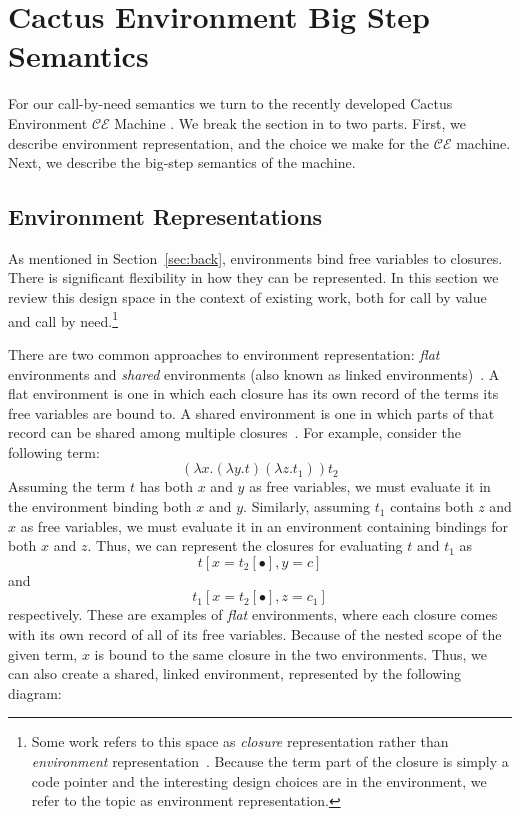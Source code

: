 \section{Cactus Environment Big Step Semantics} \label{sec:cem}

For our call-by-need semantics we turn to the recently developed Cactus
Environment $\mathcal{CE}$ Machine \cite{?}. We break the section in to two
parts. First, we describe environment representation, and the choice we make for
the $\mathcal{CE}$ machine. Next, we describe the big-step semantics of the
machine.

\subsection{Environment Representations}

As mentioned in Section~\ref{sec:back}, environments bind free variables to
closures. There is significant flexibility in how they can be represented. In
this section we review this design space in the context of existing work, both
for call by value and call by need.\footnote{Some work refers to this space as
\emph{closure} representation rather than \emph{environment}
representation~\cite{shao1994space,appel1988optimizing}.  Because the term
part of the closure is simply a code pointer and the interesting design
choices are in the environment, we refer to the topic as environment
representation.}

There are two common approaches to environment representation: \emph{flat}
environments and \emph{shared} environments (also known as linked
environments)~\cite{appel1988optimizing,shao1994space}. A flat environment is
one in which each closure has its own record of the terms its free variables are
bound to. A shared environment is one in which parts of that record can be
shared among multiple closures~\cite{appel1988optimizing,shao1994space}. For
example, consider the following term: $$(\lambda x.(\lambda y.t) (\lambda
z.t_1)) t_2$$ Assuming the term $t$ has both $x$ and $y$ as free variables, we
must evaluate it in the environment binding both $x$ and $y$.  Similarly,
assuming $t_1$ contains both $z$ and $x$ as free variables, we must evaluate it
in an environment containing bindings for both $x$ and $z$. Thus, we can
represent the closures for evaluating $t$ and $t_1$  as $$t[x=t_2[\bullet],
y=c]$$ and $$t_1[x=t_2[\bullet], z=c_1]$$ respectively.  These are examples of
\emph{flat} environments, where each closure comes with its own record of all of
its free variables. Because of the nested scope of the given term, $x$ is bound
to the same closure in the two environments. Thus, we can also create a shared,
linked environment, represented by the following diagram:

